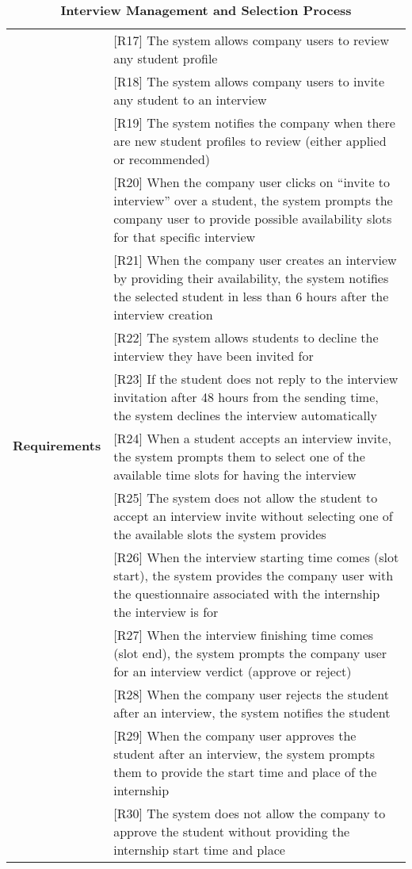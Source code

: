 \renewcommand{\arraystretch}{1.3}
\begin{longtable}{|p{}|p{}|}
\caption{\textbf{Interview Management and Selection Process}} \\ \hline
\multirow{15}{*}{\textbf{Requirements}} & [R17] The system allows company users to review any student profile \\ 
& [R18] The system allows company users to invite any student to an interview \\ 
& [R19] The system notifies the company when there are new student profiles to review (either applied or recommended) \\  
& [R20] When the company user clicks on “invite to interview” over a student, the system prompts the company user to provide possible availability slots for that specific interview \\  
& [R21] When the company user creates an interview by providing their availability, the system notifies the selected student in less than 6 hours after the interview creation \\  
& [R22] The system allows students to decline the interview they have been invited for \\  
& [R23] If the student does not reply to the interview invitation after 48 hours from the sending time, the system declines the interview automatically \\  
& [R24] When a student accepts an interview invite, the system prompts them to select one of the available time slots for having the interview \\  
& [R25] The system does not allow the student to accept an interview invite without selecting one of the available slots the system provides \\  
& [R26] When the interview starting time comes (slot start), the system provides the company user with the questionnaire associated with the internship the interview is for \\  
& [R27] When the interview finishing time comes (slot end), the system prompts the company user for an interview verdict (approve or reject) \\  
& [R28] When the company user rejects the student after an interview, the system notifies the student \\  
& [R29] When the company user approves the student after an interview, the system prompts them to provide the start time and place of the internship \\  
& [R30] The system does not allow the company to approve the student without providing the internship start time and place \\  

\end{longtable}

